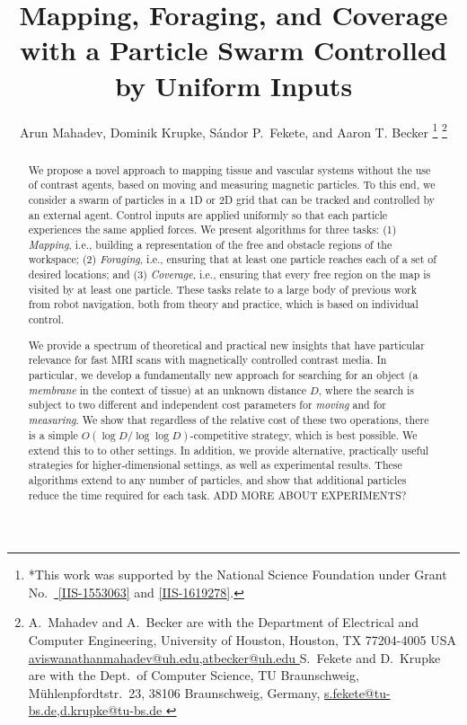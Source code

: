 \documentclass[letterpaper, 10 pt, conference]{ieeeconf}
\title{\LARGE \bf Mapping, Foraging, and Coverage\\ with a Particle Swarm Controlled by Uniform Inputs}
\author{Arun Mahadev, Dominik Krupke, S\'{a}ndor P.~Fekete, and Aaron T. Becker%
\thanks{*This work was supported by the National Science Foundation under Grant No.\ \href{http://nsf.gov/awardsearch/showAward?AWD_ID=1553063}{ [IIS-1553063]} and \href{http://nsf.gov/awardsearch/showAward?AWD_ID=1619278}{[IIS-1619278]}.}%
\thanks{{A.~Mahadev and A.~Becker are with the Department of Electrical and Computer Engineering,  University of Houston, Houston, TX 77204-4005 USA 
      \protect\url{ aviswanathanmahadev@uh.edu,atbecker@uh.edu }
S.~Fekete and D.~Krupke are with the Dept.~of Computer Science, TU Braunschweig,  M\"uhlenpfordtstr.~23, 38106 Braunschweig, Germany,
      \protect\url{s.fekete@tu-bs.de,d.krupke@tu-bs.de  }
}
} %
}
\begin{document}
\maketitle
\thispagestyle{empty}
\pagestyle{empty}


\begin{abstract}
We propose a novel approach to mapping tissue and vascular systems without the use of contrast agents,
based on moving and measuring magnetic particles.
To this end, we consider a swarm of particles in a 1D or 2D grid that can be tracked and controlled by an external agent. 
Control inputs are applied uniformly so that each particle experiences the same applied forces. 
We present algorithms for three tasks: (1) {\em Mapping}, i.e., building a representation of the free and obstacle regions of the workspace;
(2) {\em Foraging}, i.e., ensuring that at least one particle reaches each of a set of desired locations; 
and (3) {\em Coverage}, i.e., ensuring that every free region on the map is visited by at least one particle.
These tasks relate to a large body of previous work from robot navigation, both from theory and practice, 
which is based on individual control.

We provide a spectrum of theoretical and practical new insights 
that have particular relevance for fast MRI scans with magnetically controlled contrast media.
In particular, we develop a fundamentally new approach 
for searching for an object (a {\em membrane} in the context of tissue) at an unknown distance $D$, where the search is 
subject to two different and independent cost parameters
for {\em moving} and for {\em measuring}. We show that regardless of the relative cost of these two operations,
there is a simple $O(\log D/\log\log D)$-competitive strategy, which is best possible.
We extend this to to other settings. In addition, we provide alternative, practically useful strategies for higher-dimensional
settings, as well as experimental results.
These algorithms extend to any number of particles, and show that additional
particles reduce the time required for each task.  ADD MORE ABOUT EXPERIMENTS?


\end{abstract}
\end{document}
